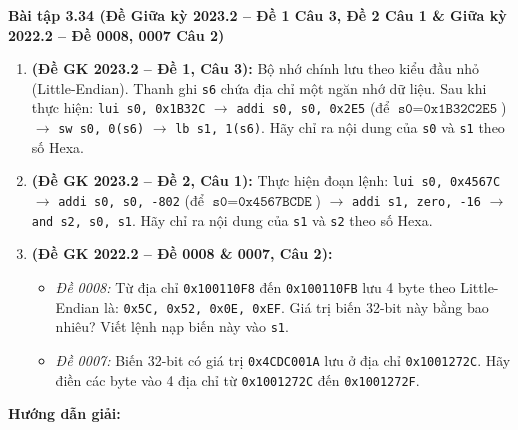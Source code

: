 \textbf{Bài tập 3.34 (Đề Giữa kỳ 2023.2 -- Đề 1 Câu 3, Đề 2 Câu 1 \& Giữa kỳ 2022.2 -- Đề 0008, 0007 Câu 2)}
\begin{enumerate}[label=\alph*)]
    \item \textbf{(Đề GK 2023.2 -- Đề 1, Câu 3):} Bộ nhớ chính lưu theo kiểu đầu nhỏ (Little-Endian). Thanh ghi \texttt{s6} chứa địa chỉ một ngăn nhớ dữ liệu. Sau khi thực hiện: \texttt{lui s0, 0x1B32C} $\rightarrow$ \texttt{addi s0, s0, 0x2E5} (để $\texttt{s0} = \texttt{0x1B32C2E5}$) $\rightarrow$ \texttt{sw s0, 0(s6)} $\rightarrow$ \texttt{lb s1, 1(s6)}. Hãy chỉ ra nội dung của \texttt{s0} và \texttt{s1} theo số Hexa.
    \item \textbf{(Đề GK 2023.2 -- Đề 2, Câu 1):} Thực hiện đoạn lệnh: \texttt{lui s0, 0x4567C} $\rightarrow$ \texttt{addi s0, s0, -802} (để $\texttt{s0} = \texttt{0x4567BCDE}$) $\rightarrow$ \texttt{addi s1, zero, -16} $\rightarrow$ \texttt{and s2, s0, s1}. Hãy chỉ ra nội dung của \texttt{s1} và \texttt{s2} theo số Hexa.
    \item \textbf{(Đề GK 2022.2 -- Đề 0008 \& 0007, Câu 2):}
    \begin{itemize}
        \item \textit{Đề 0008:} Từ địa chỉ \texttt{0x100110F8} đến \texttt{0x100110FB} lưu 4 byte theo Little-Endian là: \texttt{0x5C, 0x52, 0x0E, 0xEF}. Giá trị biến 32-bit này bằng bao nhiêu? Viết lệnh nạp biến này vào \texttt{s1}.
        \item \textit{Đề 0007:} Biến 32-bit có giá trị \texttt{0x4CDC001A} lưu ở địa chỉ \texttt{0x1001272C}. Hãy điền các byte vào 4 địa chỉ từ \texttt{0x1001272C} đến \texttt{0x1001272F}.
    \end{itemize}
\end{enumerate}
\textbf{Hướng dẫn giải:}
